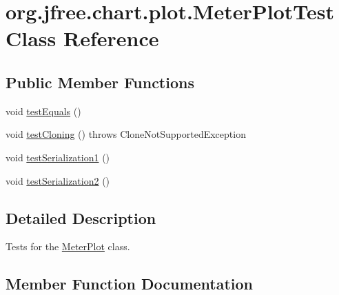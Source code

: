 \hypertarget{classorg_1_1jfree_1_1chart_1_1plot_1_1_meter_plot_test}{}\section{org.\+jfree.\+chart.\+plot.\+Meter\+Plot\+Test Class Reference}
\label{classorg_1_1jfree_1_1chart_1_1plot_1_1_meter_plot_test}
\subsection*{Public Member Functions}
\begin{DoxyCompactItemize}
\item 
void \mbox{\hyperlink{classorg_1_1jfree_1_1chart_1_1plot_1_1_meter_plot_test_af44f9bf5b2a64dc5a055ce70f8160e80}{test\+Equals}} ()
\item 
void \mbox{\hyperlink{classorg_1_1jfree_1_1chart_1_1plot_1_1_meter_plot_test_a5cff5eaba27c28bebc22cadcf7f49217}{test\+Cloning}} ()  throws Clone\+Not\+Supported\+Exception 
\item 
void \mbox{\hyperlink{classorg_1_1jfree_1_1chart_1_1plot_1_1_meter_plot_test_a18623226324da174160406f876256bf3}{test\+Serialization1}} ()
\item 
void \mbox{\hyperlink{classorg_1_1jfree_1_1chart_1_1plot_1_1_meter_plot_test_a25dc3ccec0eed6c45fd54c810e7d9f74}{test\+Serialization2}} ()
\end{DoxyCompactItemize}


\subsection{Detailed Description}
Tests for the \mbox{\hyperlink{classorg_1_1jfree_1_1chart_1_1plot_1_1_meter_plot}{Meter\+Plot}} class. 

\subsection{Member Function Documentation}
\mbox{\label{classorg_1_1jfree_1_1chart_1_1plot_1_1_meter_plot_test_a5cff5eaba27c28bebc22cadcf7f49217}} 
